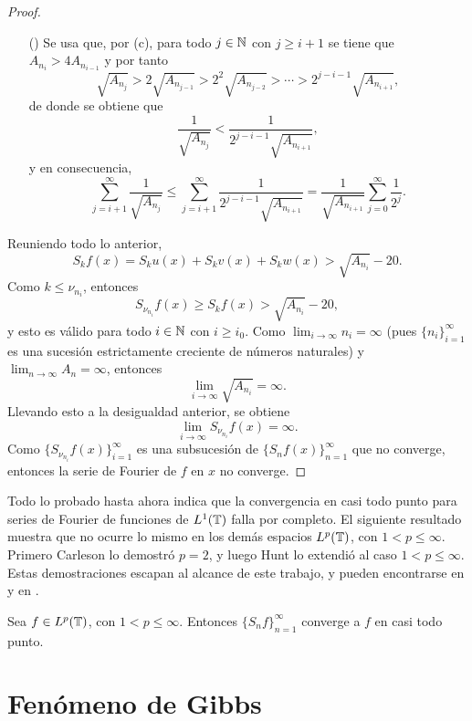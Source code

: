 \documentclass[a4paper, 12pt, oneside]{book}
\begin{document}
\begin{proof}
\begin{itemize}
        \item[(\asts{2})] Se usa que, por (c), para todo $j \in \mathbb N$ con $j \geq i+1$ se tiene que $A_{n_i} > 4A_{n_{i-1}}$ y por tanto
        \[\sqrt{A_{n_j}} > 2\sqrt{A_{n_{j-1}}} > 2^2 \sqrt{A_{n_{j-2}}} > \cdots > 2^{j-i-1}\sqrt{A_{n_{i+1}}},\]
        de donde se obtiene que
        \[\frac{1}{\sqrt{A_{n_j}}} < \frac{1}{2^{j-i-1}\sqrt{A_{n_{i+1}}}},\]
        y en consecuencia,
        \[\sum_{j=i+1}^\infty \frac{1}{\sqrt{A_{n_j}}} \leq \sum_{j=i+1}^\infty \frac{1}{2^{j-i-1}\sqrt{A_{n_{i+1}}}} = \frac{1}{\sqrt{A_{n_{i+1}}}}\sum_{j=0}^\infty \frac{1}{2^j}.\]
    \end{itemize}
    Reuniendo todo lo anterior,
    \[S_kf(x) = S_ku(x)+S_kv(x)+S_kw(x)> \sqrt{A_{n_i}}-20.\]
    Como $k \leq \nu_{n_i}$, entonces
    \[S_{\nu_{n_i}}f(x) \geq S_kf(x) > \sqrt{A_{n_i}}-20,\]
    y esto es válido para todo $i \in \mathbb N$ con $i \geq i_0$. Como $\lim_{i \to \infty} n_i = \infty$ (pues $\{n_i\}_{i=1}^\infty$ es una sucesión estrictamente creciente de números naturales) y $\lim_{n \to \infty} A_n = \infty$, entonces \[\lim_{i \to \infty} \sqrt{A_{n_i}} = \infty.\]
    Llevando esto a la desigualdad anterior, se obtiene
    \[\lim_{i \to \infty} S_{\nu_{n_i}}f(x) = \infty.\]
    Como $\{S_{\nu_{n_i}}f(x)\}_{i=1}^\infty$ es una subsucesión de $\{S_nf(x)\}_{n=1}^\infty$ que no converge, entonces la serie de Fourier de $f$ en $x$ no converge.
\end{proof}

Todo lo probado hasta ahora indica que la convergencia en casi todo punto para series de Fourier de funciones de $L^1(\mathbb T)$ falla por completo. El siguiente resultado muestra que no ocurre lo mismo en los demás espacios $L^p(\mathbb T)$, con $1 < p \leq \infty$. Primero Carleson lo demostró $p = 2$, y luego Hunt lo extendió al caso $1<p\leq\infty$. Estas demostraciones escapan al alcance de este trabajo, y pueden encontrarse en \cite{carleson} y en \cite{hunt}.

\begin{theorem}
    Sea $f \in L^p(\mathbb T)$, con $1 < p \leq \infty$. Entonces $\{S_nf\}_{n=1}^\infty$ converge a $f$ en casi todo punto.
\end{theorem}

\section{Fenómeno de Gibbs}
\end{document}
